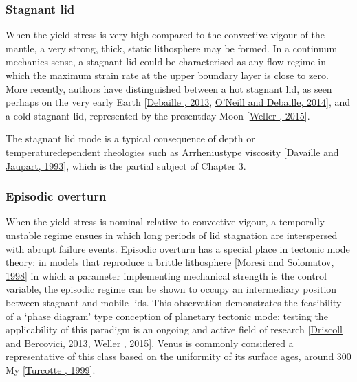 \documentclass[letterpaper,10pt,english]{jupyterBook}
\begin{document}
\subsubsection{Stagnant lid}
\label{\detokenize{content/chapter_01_background/main:stagnant-lid}}
\sphinxAtStartPar
When the yield stress is very high compared to the convective vigour of the mantle, a very strong, thick, static lithosphere may be formed. In a continuum mechanics sense, a stagnant lid could be characterised as any flow regime in which the maximum strain rate at the upper boundary layer is close to zero. More recently, authors have distinguished between a hot stagnant lid, as seen perhaps on the very early Earth {[}\hyperlink{cite.references:id58}{Debaille , 2013}, \hyperlink{cite.references:id327}{O'Neill and Debaille, 2014}{]}, and a cold stagnant lid, represented by the present\sphinxhyphen{}day Moon {[}\hyperlink{cite.references:id195}{Weller , 2015}{]}.

\sphinxAtStartPar
The stagnant lid mode is a typical consequence of depth\sphinxhyphen{} or temperature\sphinxhyphen{}dependent rheologies such as Arrhenius\sphinxhyphen{}type viscosity {[}\hyperlink{cite.references:id387}{Davaille and Jaupart, 1993}{]}, which is the partial subject of Chapter 3.


\subsubsection{Episodic overturn}
\label{\detokenize{content/chapter_01_background/main:episodic-overturn}}
\sphinxAtStartPar
When the yield stress is nominal relative to convective vigour, a temporally unstable regime ensues in which long periods of lid stagnation are interspersed with abrupt failure events. Episodic overturn has a special place in tectonic mode theory: in models that reproduce a brittle lithosphere {[}\hyperlink{cite.references:id401}{Moresi and Solomatov, 1998}{]} in which a parameter implementing mechanical strength is the control variable, the episodic regime can be shown to occupy an intermediary position between stagnant and mobile lids. This observation demonstrates the feasibility of a ‘phase diagram’ type conception of planetary tectonic mode: testing the applicability of this paradigm is an ongoing and active field of research {[}\hyperlink{cite.references:id57}{Driscoll and Bercovici, 2013}, \hyperlink{cite.references:id195}{Weller , 2015}{]}. Venus is commonly considered a representative of this class based on the uniformity of its surface ages, around 300 My {[}\hyperlink{cite.references:id106}{Turcotte , 1999}{]}.
\end{document}
